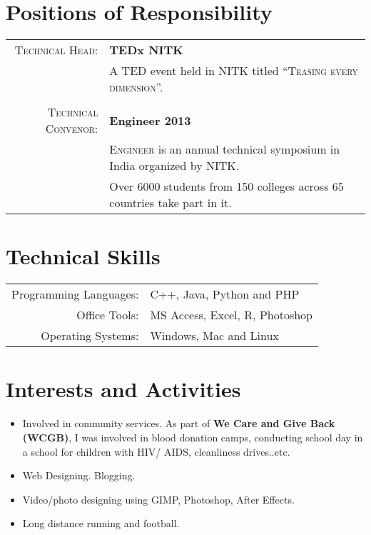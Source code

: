 \documentclass[a4paper,10pt]{article} %
\begin{document}
\section{Positions of Responsibility}
\begin{tabular}{rl}
\textsc{Technical Head:} & \textbf{TEDx NITK}\\
&A TED event held in NITK titled \textsc{“Teasing every dimension”.}\\
\\
\textsc{Technical Convenor:} & \textbf{Engineer 2013}\\
&\textsc{Engineer} is an annual technical symposium in India organized by NITK.\\
&Over 6000 students from 150 colleges across 65 countries take part in it.\\
\end{tabular}


\section{Technical Skills}

\begin{tabular}{rl}

Programming Languages: &  C++, Java, Python and PHP\\
Office Tools: & MS Access, Excel, R, Photoshop\\
Operating Systems: & Windows, Mac and Linux

\end{tabular}


\section{Interests and Activities}

\begin{itemize}
  \item Involved in community services. As part of \textbf{We Care and Give Back (WCGB)}, I was involved in
blood donation camps, conducting school day in a school for children with HIV/ AIDS, cleanliness
drives..etc.
  \item Web Designing. Blogging.
\item Video/photo designing using GIMP, Photoshop, After Effects.
\item Long distance running and football.
\end{itemize}
\end{document}
